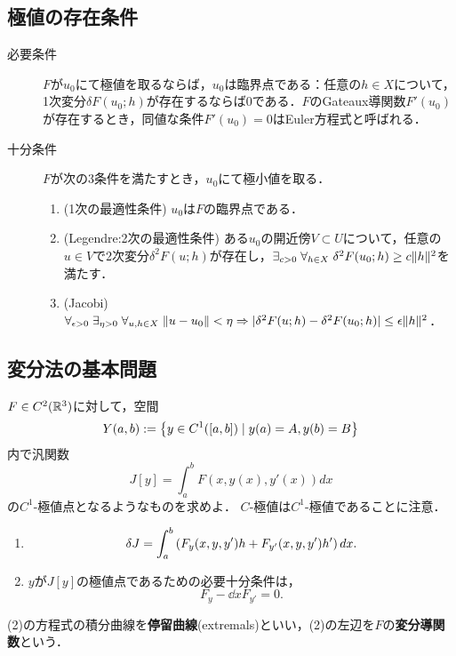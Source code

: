 \documentclass[uplatex,dvipdfmx]{jsreport}
\begin{document}
\subsection{極値の存在条件}

\begin{theorem}[極値の特徴付け]\mbox{}
    \begin{description}
        \item[必要条件] $F$が$u_0$にて極値を取るならば，$u_0$は臨界点である：任意の$h\in X$について，1次変分$\delta F(u_0;h)$が存在するならば$0$である．$F$のGateaux導関数$F'(u_0)$が存在するとき，同値な条件$F'(u_0)=0$はEuler方程式と呼ばれる．
        \item[十分条件] $F$が次の3条件を満たすとき，$u_0$にて極小値を取る．
        \begin{enumerate}
            \item (1次の最適性条件) $u_0$は$F$の臨界点である．
            \item (Legendre:2次の最適性条件) ある$u_0$の開近傍$V\subset U$について，任意の$u\in V$で2次変分$\delta^2F(u;h)$が存在し，$\exists_{c>0}\;\forall_{h\in X}\;\delta^2 F(u_0;h)\ge c\|h\|^2$を満たす．
            \item (Jacobi) $\forall_{\epsilon>0}\;\exists_{\eta>0}\;\forall_{u,h\in X}\;\|u-u_0\|<\eta\Rightarrow\lvert\delta^2F(u;h)-\delta^2F(u_0;h)\rvert\le\epsilon\|h\|^2$．
        \end{enumerate}
    \end{description}
\end{theorem}

\subsection{変分法の基本問題}

\begin{problem}
    $F\in C^2(\mathbb{R}^3)$に対して，空間
    \[Y(a,b):=\left\{y\in C^1([a,b])\mid y(a)=A,y(b)=B\right\}\]
    内で汎関数
    \[J[y]=\int^b_aF(x,y(x),y'(x))dx\]
    の$C^1$-極値点となるようなものを求めよ．
    $C$-極値は$C^1$-極値であることに注意．
\end{problem}

\begin{proposition}[基本問題の変分とEuler方程式]\mbox{}
    \begin{enumerate}
        \item \[\delta J=\int^b_a\left(F_y(x,y,y')h+F_{y'}(x,y,y')h'\right)dx.\]
        \item $y$が$J[y]$の極値点であるための必要十分条件は，
        \[F_y-\dd{}{x}F_{y'}=0.\]
    \end{enumerate}
    (2)の方程式の積分曲線を\textbf{停留曲線}(extremals)といい，(2)の左辺を$F$の\textbf{変分導関数}という．
\end{proposition}
\end{document}
